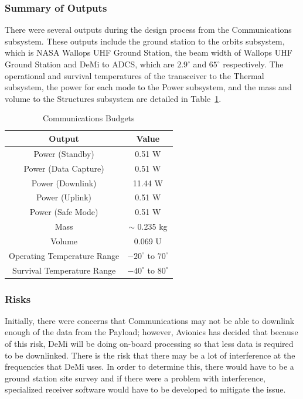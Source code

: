 \documentclass[12pt]{article}
\begin{document}
\subsubsection{Summary of Outputs}

There were several outputs during the design process from the Communications subsystem. These outputs include the ground station to the orbits subsystem, which is NASA Wallops UHF Ground Station, the beam width of Wallops UHF Ground Station and DeMi to ADCS, which are $2.9^\circ$ and $65^\circ$ respectively. The operational and survival temperatures of the transceiver to the Thermal subsystem, the power for each mode to the Power subsystem, and the mass and volume to the Structures subsystem are detailed in Table~\ref{table:comm_summary_outputs}.
	
\begin{table}[ht]
\caption{Communications Budgets}
\begin{center}
    \begin{tabular}{|c||c|} \hline
    	\textbf{Output} & \textbf{Value} \\ \hline \hline
    Power (Standby) & 0.51 W  \\
    Power (Data Capture) & 0.51 W \\
    Power (Downlink) & 11.44 W \\
    Power (Uplink) & 0.51 W \\
    Power (Safe Mode) & 0.51 W \\
    Mass & $\sim$ 0.235 kg  \\
    Volume & 0.069 U \\ 
Operating Temperature Range & $-20^\circ$ to $70^\circ$ \\
Survival Temperature Range & $-40^\circ$ to $80^\circ$ \\ \hline 
    \end{tabular}\label{table:comm_summary_outputs}
\end{center}
\end{table}

			\subsubsection{Risks}
			Initially, there were concerns that Communications may not be able to downlink enough of the
data from the Payload; however, Avionics has decided that because of this risk, DeMi will be
doing on-board processing so that less data is required to be downlinked. There is the risk
that there may be a lot of interference at the frequencies that DeMi uses. In order to determine
this, there would have to be a ground station site survey and if there were a problem with
interference, specialized receiver software would have to be developed to mitigate the issue.
\end{document}
